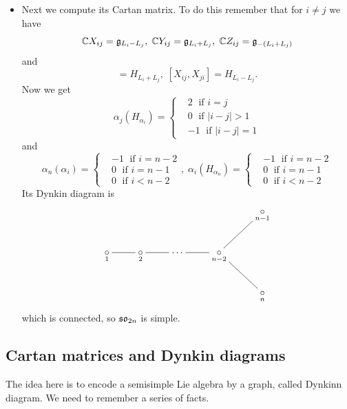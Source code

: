 \begin{itemize}
    \item Next we compute its Cartan matrix. To do this remember that for $i\neq j$ we have
    \begin{equation}
        \mathbb{C} X_{ij}=\mathfrak{g}_{L_i-L_j},\;\mathbb{C} Y_{ij}=\mathfrak{g}_{L_i+L_j},\; \mathbb{C} Z_{ij}=\mathfrak{g}_{-(L_i+L_j)}
    \end{equation}
    and 
    \begin{equation}
        [Y_{ij},Z_{ij}]=H_{L_i+L_j},\; [X_{ij},X_{ji}]=H_{L_i-L_j}.
    \end{equation}
    Now we get 
    \begin{equation}
        \alpha_j(H_{\alpha_i})=\left\{\begin{aligned}
            & 2\;\text{ if } i=j\\
    & 0\;\text{ if } |i-j|>1\\        
    & -1\;\text{ if } |i-j|=1
        \end{aligned}\right.
    \end{equation}
    and 
    \begin{equation}
        \alpha_n(\alpha_i)=\left\{\begin{aligned}
            &-1\;\text{ if } i=n-2\\
            &0 \;\text{ if } i=n-1\\
            &0\;\text{ if } i<n-2
        \end{aligned}\right.,\;
        \alpha_i(H_{\alpha_n})=\left\{\begin{aligned}
            &-1\;\text{ if } i =n-2\\
            &0\;\text{ if }i=n-1\\
            &0\;\text{ if } i<n-2
        \end{aligned}\right.
    \end{equation}
    Its Dynkin diagram is 
    \[
    \xymatrix{
        &&&& \underset{n-1}{\circ}\\
         \underset{1}{\circ} \ar@{-}[r]& \underset{2}{\circ} 
         \ar@{-}[r]&\cdots \ar@{-}[r]& \underset{n-2}{\circ}\ar@{-}[rd]\ar@{-}[ru]&\\
        &&&& \underset{n}{\circ} 
    }
    \]
    which is connected, so $\mathfrak{so}_{2n}$ is simple.
\end{itemize}




\subsection{Cartan matrices and Dynkin diagrams}
The idea here is to encode a semisimple Lie algebra by a graph, called Dynkinn diagram. We need to remember 
a series of facts.

